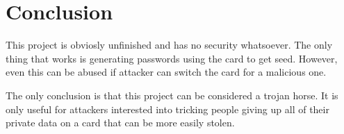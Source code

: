 \documentclass[paper=a4, fontsize=12pt]{scrartcl}
\begin{document}
\section{Conclusion}
This project is obviosly unfinished and has no security whatsoever.
The only thing that works is generating passwords using the card to get seed.
However, even this can be abused if attacker can switch the card for a malicious one.

The only conclusion is that this project can be considered a trojan horse.
It is only useful for attackers interested into tricking people giving up all of their private data on a card that can be more easily stolen.
\end{document}
